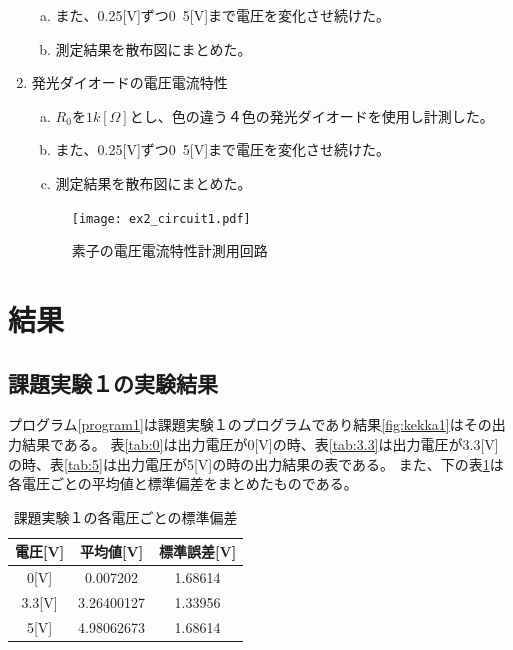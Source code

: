 \documentclass[11pt,dvipdfmx]{jarticle}
\begin{document}
\begin{enumerate}[1.]
\begin{enumerate}[a.]
					\item また、0.25[V]ずつ0~5[V]まで電圧を変化させ続けた。
					\item 測定結果を散布図にまとめた。 
				\end{enumerate}
			\item 発光ダイオードの電圧電流特性 
				\begin{enumerate}[a.]
					\item $R_0を1k[\Omega]$とし、色の違う４色の発光ダイオードを使用し計測した。
					\item また、0.25[V]ずつ0~5[V]まで電圧を変化させ続けた。
					\item 測定結果を散布図にまとめた。 
				\end{enumerate}

				\begin{figure}[h]
					\centering
					\texttt{[image: ex2\_circuit1.pdf]}
					\caption{素子の電圧電流特性計測用回路}
					\label{fig:circuit3}
				\end{figure}
		\end{enumerate}
		





\section{結果}
	\subsection{課題実験１の実験結果}
		プログラム\ref{program1}は課題実験１のプログラムであり結果\ref{fig:kekka1}はその出力結果である。
		表\ref{tab:0}は出力電圧が0[V]の時、表\ref{tab:3.3}は出力電圧が3.3[V]の時、表\ref{tab:5}は出力電圧が5[V]の時の出力結果の表である。
		また、下の表\ref{tab:hensa}は各電圧ごとの平均値と標準偏差をまとめたものである。
		
				

		\begin{table}[H]
			\caption{課題実験１の各電圧ごとの標準偏差}
			\centering
			\label{tab:hensa}
			\begin{tabular}{|c|c|c|}
				\hline
				電圧[V]	&	平均値[V]	&	標準誤差[V]\\
				\hline \hline
				0[V]		&0.007202&	1.68614\\
				\hline
				3.3[V]	&3.26400127&	1.33956\\
				\hline
				5[V]		&4.98062673&	1.68614\\
				\hline
			\end{tabular}
		\end{table}
\end{document}
